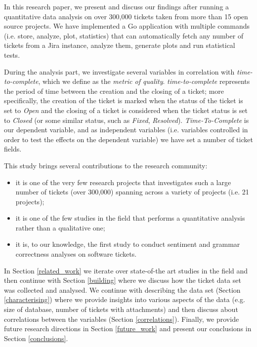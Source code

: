 \documentclass{mpaper}
\begin{document}
In this research paper, we present and discuss our findings after running a quantitative data analysis 
on over 300,000 tickets taken from more than 15 open source projects. We have implemented a Go application 
with multiple commands (i.e. store, analyze, plot, statistics) that can automatically fetch any number of tickets 
from a Jira instance, analyze them, generate plots and run statistical tests. 

During the analysis part, we investigate several variables in correlation with \emph{time-to-complete}, 
which we define as the \emph{metric of quality}. \emph{time-to-complete} represents the period of time between the creation 
and the closing of a ticket; more specifically, the creation of the ticket is marked when the status of the ticket is set to 
\emph{Open} and the closing of a ticket is considered when the ticket status is set to \emph{Closed} (or some similar status, 
such as \emph{Fixed}, \emph{Resolved}). \emph{Time-To-Complete} is our dependent variable, and as independent variables 
(i.e. variables controlled in order to test the effects on the dependent variable) we have set a number of ticket fields. 

This study brings several contributions to the research community:
\begin{itemize}
  \item it is one of the very few research projects that investigates such a large number of tickets (over 300,000) spanning
  across a variety of projects (i.e. 21 projects);
  \item it is one of the few studies in the field that performs a quantitative analysis rather than a qualitative one;
  \item it is, to our knowledge, the first study to conduct sentiment and grammar correctness analyses on software tickets.
\end{itemize}

In Section \ref{related_work} we iterate over state-of-the art studies in the field and then continue with 
Section \ref{building} where we discuss how the ticket data set was collected and analysed. We continue with describing 
the data set (Section \ref{characterising}) where we provide insights into various aspects of the data (e.g. size of database,
number of tickets with attachments) and then discuss about correlations between the variables (Section \ref{correlations}).
Finally, we provide future research directions in Section \ref{future_work} and present our conclusions in Section \ref{conclusions}.
\end{document}
